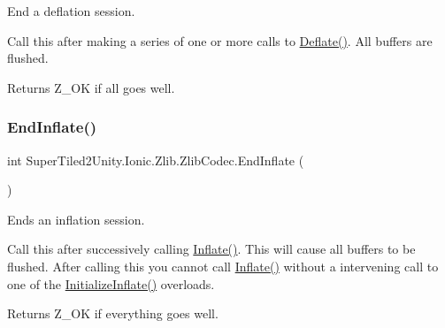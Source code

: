 End a deflation session. 

Call this after making a series of one or more calls to \mbox{\hyperlink{class_super_tiled2_unity_1_1_ionic_1_1_zlib_1_1_zlib_codec_afeb80a3bb4f9bfdbe76e7364d617808c}{Deflate()}}. All buffers are flushed. 

\begin{DoxyReturn}{Returns}
Z\+\_\+\+OK if all goes well.
\end{DoxyReturn}
\mbox{\label{class_super_tiled2_unity_1_1_ionic_1_1_zlib_1_1_zlib_codec_a66b84e956a676ace6e5acda167693d92}} 
\subsubsection{\texorpdfstring{End\+Inflate()}{EndInflate()}}
{\footnotesize\ttfamily int Super\+Tiled2\+Unity.\+Ionic.\+Zlib.\+Zlib\+Codec.\+End\+Inflate (\begin{DoxyParamCaption}{ }\end{DoxyParamCaption})}



Ends an inflation session. 

Call this after successively calling \mbox{\hyperlink{class_super_tiled2_unity_1_1_ionic_1_1_zlib_1_1_zlib_codec_a9586e5a25c06331824638439938ac8c8}{Inflate()}}. This will cause all buffers to be flushed. After calling this you cannot call \mbox{\hyperlink{class_super_tiled2_unity_1_1_ionic_1_1_zlib_1_1_zlib_codec_a9586e5a25c06331824638439938ac8c8}{Inflate()}} without a intervening call to one of the \mbox{\hyperlink{class_super_tiled2_unity_1_1_ionic_1_1_zlib_1_1_zlib_codec_aa50e75125aea07774abc7a65b10e1926}{Initialize\+Inflate()}} overloads. 

\begin{DoxyReturn}{Returns}
Z\+\_\+\+OK if everything goes well.
\end{DoxyReturn}
\mbox{\label{class_super_tiled2_unity_1_1_ionic_1_1_zlib_1_1_zlib_codec_a9586e5a25c06331824638439938ac8c8}} 
